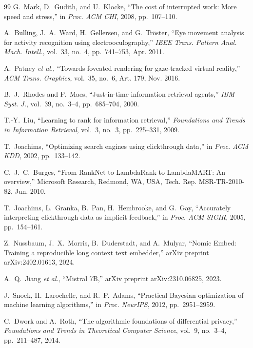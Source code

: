 \documentclass[journal]{IEEEtran}
\begin{document}
\begin{thebibliography}{99}
G.~Mark, D.~Gudith, and U.~Klocke, ``The cost of interrupted work: More speed and stress,'' in \emph{Proc. ACM CHI}, 2008, pp.~107--110.

A.~Bulling, J.~A.~Ward, H.~Gellersen, and G.~Tr\"{o}ster, ``Eye movement analysis for activity recognition using electrooculography,'' \emph{IEEE Trans. Pattern Anal. Mach. Intell.}, vol.~33, no.~4, pp.~741--753, Apr. 2011.

A.~Patney \emph{et al.}, ``Towards foveated rendering for gaze-tracked virtual reality,'' \emph{ACM Trans. Graphics}, vol.~35, no.~6, Art. 179, Nov. 2016.

B.~J.~Rhodes and P.~Maes, ``Just-in-time information retrieval agents,'' \emph{IBM Syst. J.}, vol.~39, no.~3--4, pp.~685--704, 2000.

T.-Y.~Liu, ``Learning to rank for information retrieval,'' \emph{Foundations and Trends in Information Retrieval}, vol.~3, no.~3, pp.~225--331, 2009.

T.~Joachims, ``Optimizing search engines using clickthrough data,'' in \emph{Proc. ACM KDD}, 2002, pp.~133--142.

C.~J.~C.~Burges, ``From RankNet to LambdaRank to LambdaMART: An overview,'' Microsoft Research, Redmond, WA, USA, Tech. Rep. MSR-TR-2010-82, Jun. 2010.

T.~Joachims, L.~Granka, B.~Pan, H.~Hembrooke, and G.~Gay, ``Accurately interpreting clickthrough data as implicit feedback,'' in \emph{Proc. ACM SIGIR}, 2005, pp.~154--161.

Z.~Nussbaum, J.~X.~Morris, B.~Duderstadt, and A.~Mulyar, ``Nomic Embed: Training a reproducible long context text embedder,'' arXiv preprint arXiv:2402.01613, 2024.

A.~Q.~Jiang \emph{et al.}, ``Mistral 7B,'' arXiv preprint arXiv:2310.06825, 2023.

J.~Snoek, H.~Larochelle, and R.~P.~Adams, ``Practical Bayesian optimization of machine learning algorithms,'' in \emph{Proc. NeurIPS}, 2012, pp.~2951--2959.

C.~Dwork and A.~Roth, ``The algorithmic foundations of differential privacy,'' \emph{Foundations and Trends in Theoretical Computer Science}, vol.~9, no.~3--4, pp.~211--487, 2014.


\end{thebibliography}
\end{document}

